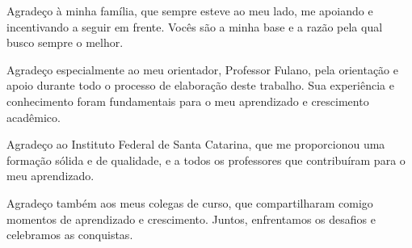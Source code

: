 \begin{agradecimentos}
    
    Agradeço à minha família, que sempre esteve ao meu lado, me apoiando e incentivando a seguir em frente. Vocês são a minha base e a razão pela qual busco sempre o melhor.
    
    Agradeço especialmente ao meu orientador, Professor Fulano, pela orientação e apoio durante todo o processo de elaboração deste trabalho. Sua experiência e conhecimento foram fundamentais para o meu aprendizado e crescimento acadêmico.
    
    Agradeço ao Instituto Federal de Santa Catarina, que me proporcionou uma formação sólida e de qualidade, e a todos os professores que contribuíram para o meu aprendizado.
    
    Agradeço também aos meus colegas de curso, que compartilharam comigo momentos de aprendizado e crescimento. Juntos, enfrentamos os desafios e celebramos as conquistas.
    
\end{agradecimentos}